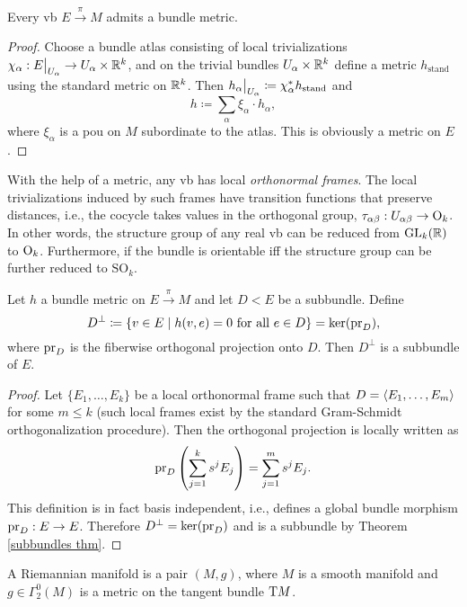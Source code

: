 \begin{thm}\label{prop 4.4.2 RS1}
    Every \gls{vb} $E\overset\pi\to M$ admits a bundle metric. 
\end{thm}
\begin{proof}
    Choose a bundle atlas consisting of local trivializations $\chi_\alpha:\restr{E}{U_\alpha}\to U_\alpha\times\bbR^k$, and on the trivial bundles $U_\alpha\times\mathbb{R}^k$ define a metric $h_{\text{stand}}$ using the standard metric on $\mathbb{R}^k$. Then $\restr{h_\alpha}{U_\alpha}\coloneqq \chi_\alpha^\ast h_{\text{stand}}$ and 
    \[h\coloneqq \sum_\alpha \xi_\alpha \cdot h_\alpha,\]
    where $\xi_\alpha$ is a \gls{pou} on $M$ subordinate to the atlas. This is obviously a metric on $E$.
    \end{proof}
    \begin{cor}
    With the help of a metric, any \gls{vb} has local \emph{orthonormal frames}. The local trivializations induced by such frames have transition functions that preserve distances, i.e., the cocycle takes values in the orthogonal group, $\tau_{\alpha\beta}:U_{\alpha\beta}\to \operatorname{O}_k$. In other words, the structure group of any real \gls{vb} can be reduced from $\operatorname{GL}_k(\mathbb{R} )$ to $\operatorname{O}_k$. Furthermore, if the bundle is orientable iff the structure group can be further reduced to $\mathrm{SO}_k$.
\end{cor}

\begin{prop}
    Let $h$ a bundle metric on $E\overset\pi\to M$ and let $D< E$ be a subbundle. Define
    \[D^\perp \coloneqq \{v\in E\mid h(v,e)=0 \text{ for all }e\in D\}=\ker (\operatorname{pr}_D),\]
    where $\operatorname{pr}_D$ is the fiberwise orthogonal projection onto $D$. Then $D^\perp$ is a subbundle of $E$.
\end{prop}
\begin{proof}
    Let $\{E_1,\ldots,E_k\}$ be a local orthonormal frame such that $D=\left\langle E_1,\ldots,E_m\right\rangle$ for some $m\leq k$ (such local frames exist by the standard Gram-Schmidt orthogonalization procedure). Then the orthogonal projection is locally written as
    \[\operatorname{pr}_D \left(\sum_{j=1}^k s^j E_j\right)=\sum_{j=1}^m s^j E_j.\]
    This definition is in fact basis independent, i.e., defines a global bundle morphism $\operatorname{pr}_D:E\to E$. Therefore $D^\perp =\ker (\operatorname{pr}_D)$ and is a subbundle by Theorem \ref{subbundles thm}.
\end{proof}


\begin{defn}
    A Riemannian manifold is a pair $(M,g)$, where $M$ is a smooth manifold and $g\in\Gamma^0_2(M)$ is a metric on the tangent bundle $\mathrm{T} M$.
\end{defn}


